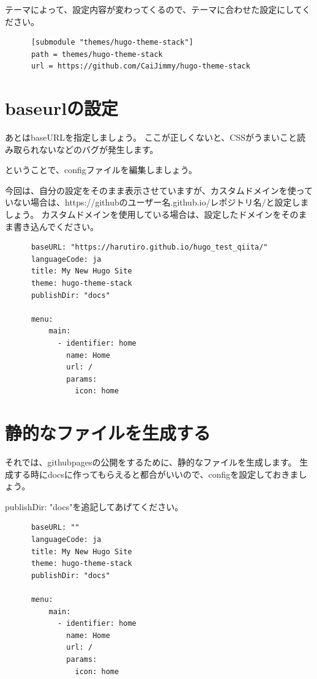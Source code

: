  テーマによって、設定内容が変わってくるので、テーマに合わせた設定にしてください。

  \begin{tcolorbox}[breakable]
    \begin{verbatim}
      [submodule "themes/hugo-theme-stack"]
      path = themes/hugo-theme-stack
      url = https://github.com/CaiJimmy/hugo-theme-stack
    \end{verbatim}
  \end{tcolorbox}

\section{baseurlの設定}

  あとはbaseURLを指定しましょう。
  ここが正しくないと、CSSがうまいこと読み取られないなどのバグが発生します。

  ということで、configファイルを編集しましょう。

  今回は、自分の設定をそのまま表示させていますが、カスタムドメインを使っていない場合は、https://githubのユーザー名.github.io/レポジトリ名/と設定しましょう。
  カスタムドメインを使用している場合は、設定したドメインをそのまま書き込んでください。

  \begin{tcolorbox}[breakable]
    \begin{verbatim}
      baseURL: "https://harutiro.github.io/hugo_test_qiita/"
      languageCode: ja
      title: My New Hugo Site
      theme: hugo-theme-stack
      publishDir: "docs"

      menu:
          main:
            - identifier: home
              name: Home
              url: /
              params:
                icon: home
    \end{verbatim}
  \end{tcolorbox}

\section{静的なファイルを生成する}

  それでは、githubpagesの公開をするために、静的なファイルを生成します。
  生成する時にdocsに作ってもらえると都合がいいので、configを設定しておきましょう。

  publishDir: "docs"を追記してあげてください。

  \begin{tcolorbox}[breakable]
    \begin{verbatim}
      baseURL: ""
      languageCode: ja
      title: My New Hugo Site
      theme: hugo-theme-stack
      publishDir: "docs"

      menu:
          main:
            - identifier: home
              name: Home
              url: /
              params:
                icon: home
    \end{verbatim}
  \end{tcolorbox}


